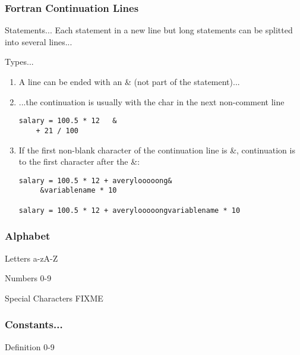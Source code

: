 \documentclass[xcolor=dvipsnames,dvip,notes=show,table]{beamer}
\begin{document}
\begin{frame}[fragile]
\frametitle{Fortran Continuation Lines}

\begin{exampleblock}{Statements...}
Each statement in a new line but long statements can be splitted into several lines...
\end{exampleblock}

\tiny
\begin{block}{Types...}
\begin{enumerate}
 \item A line can be ended with an \& (not part of the statement)...
 \item ...the continuation is usually with the char in the next non-comment line

 \begin{lstlisting}
salary = 100.5 * 12   &
    + 21 / 100
 \end{lstlisting}

 \item If the first non-blank character of the continuation line is \&, continuation is to the first character after the \&:
  \begin{lstlisting}
salary = 100.5 * 12 + averylooooong&
     &variablename * 10
     
salary = 100.5 * 12 + averylooooongvariablename * 10
\end{lstlisting}
  
\end{enumerate}

\end{block}


\end{frame}
% 

\begin{frame}[fragile]
 \frametitle{Alphabet}
 \begin{block}{Letters}
  a-zA-Z
 \end{block}
 
 \begin{exampleblock}{Numbers}
 0-9
 \end{exampleblock}
% 
% 
 \begin{alertblock}{Special Characters}
 FIXME
 \end{alertblock}
 
\end{frame}


\begin{frame}[fragile]
\frametitle{Constants...}
\scriptsize
  \begin{exampleblock}{Definition}
 0-9
 \end{exampleblock}

 
 
 
\end{frame}
\end{document}
